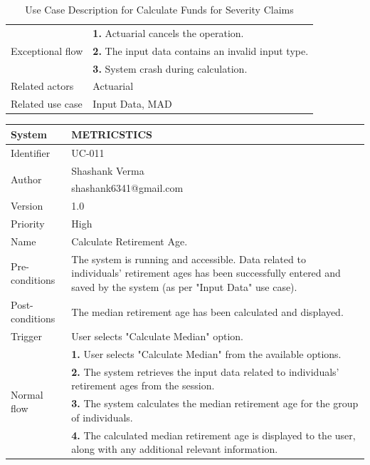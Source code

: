 \begin{table}[htb]
\begin{tabular}{|p{4cm}|p{12cm}|}
         
        
        \hline
        \multirow{3}{*}{Exceptional flow} 
        & \textbf{1.} Actuarial cancels the operation. \\ 
        & \textbf{2.} The input data contains an invalid input type.   \\ 
         & \textbf{3.} System crash during calculation. \\ \hline 
        Related actors & Actuarial \\ \hline
        Related use case & Input Data, MAD  \\ \hline
    \end{tabular}
    \caption{Use Case Description for Calculate Funds for Severity Claims}
    \label{tab:my_label}
\end{table}
\begin{table}[htb]
    \centering
     \begin{tabular}{|p{4cm}|p{12cm}|} \hline 
         System &  METRICSTICS\\ \hline 
         
         Identifier & UC-011 \\ \hline 
         
         \multirow{2}{*}{Author} & Shashank Verma   \\
         &shashank6341@gmail.com \\
           \hline 
           Version & 1.0\\ \hline
         
         Priority &  High\\ \hline 
         
         Name & Calculate Retirement Age. \\ \hline 
         Pre-conditions & The system is running and accessible.
Data related to individuals' retirement ages has been successfully entered and saved by the system (as per "Input Data" use case).
 \\ \hline 
         Post-conditions & The median retirement age has been calculated and displayed.  \\ \hline
         Trigger & User selects "Calculate Median" option. \\ \hline
        \multirow{4}{*}{Normal flow} 
        & \textbf{1.} User selects "Calculate Median" from the available options. \\ 
        & \textbf{2.} The system retrieves the input data related to individuals' retirement ages from the session.   \\ 
 & \textbf{3.} The system calculates the median retirement age for the group of individuals.\\ 
  & \textbf{4.} The calculated median retirement age is displayed to the user, along with any additional relevant information. \\ 
        


\end{tabular}
\end{table}
